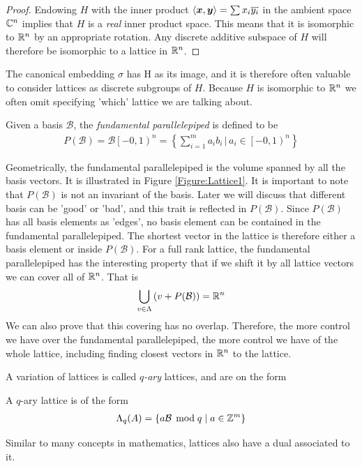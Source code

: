     \begin{proof}
        Endowing \(H\) with the inner product \(\langle \boldsymbol{x}, \boldsymbol{y} \rangle = \sum x_i\overline{y_i}\) in the ambient space \(\mathbb{C}^n\) implies that \(H\) is a \emph{real} inner product space. This means that it is isomorphic to \(\mathbb{R}^n\) by an appropriate rotation\cite{How Not To RLWE}. Any discrete additive subspace of \(H\) will therefore be isomorphic to a lattice in \(\mathbb{R}^n\).
    \end{proof}
    The canonical embedding \(\sigma\) has H as its image, and it is therefore often valuable to consider lattices as discrete subgroups of \(H\). Because \(H\) is isomorphic to \(\mathbb{R}^n\) we often omit specifying 'which' lattice we are talking about. 
    \begin{definition}
        Given a basis \(\mathcal{B}\), the \emph{fundamental parallelepiped} is defined to be
            \begin{align*}
                P(\mathcal{B}) = \mathcal{B}\left[ -0,1\right)^n = \left\{ \sum\limits_{i = 1}^m a_ib_i\,|\,a_i\in\left[ -0,1\right)^n\right\}
            \end{align*}
    \end{definition}
    Geometrically, the fundamental parallelepiped is the volume spanned by all the basis vectors. It is illustrated in Figure \ref{Figure:Lattice1}. It is important to note that \(P(\mathcal{B})\) is not an invariant of the basis. Later we will discuss that different basis can be 'good' or 'bad', and this trait is reflected in \(P(\mathcal{B})\). Since \(P(\mathcal{B})\) has all basis elements as 'edges', no basis element can be contained in the fundamental parallelepiped. The shortest vector in the lattice is therefore either a basis element or inside \(P(\mathcal{B})\). For a full rank lattice, the fundamental parallelepiped has the interesting property that if we shift it by all lattice vectors we can cover all of \(\mathbb{R}^n\). That is
    \begin{align*}
        \bigcup\limits_{v\in\Lambda}\left( v + P(\mathcal{B})\right) = \mathbb{R}^n
    \end{align*}
    We can also prove that this covering has no overlap. Therefore, the more control we have over the fundamental parallelepiped, the more control we have of the whole lattice, including finding closest vectors in \(\mathbb{R}^n\) to the lattice. \par
    A variation of lattices is called \emph{\(q\)-ary} lattices, and are on the form
    \begin{definition}
        A \(q\)-ary lattice is of the form 
        \begin{align*}
            \Lambda_q(A) = \left\{ a\mathcal{B}\mathop{}\!\mathrm{\; mod \;} q\;|\; a\in\mathbb{Z}^m\right\}
        \end{align*}
    \end{definition}
    Similar to many concepts in mathematics, lattices also have a dual associated to it.
    
